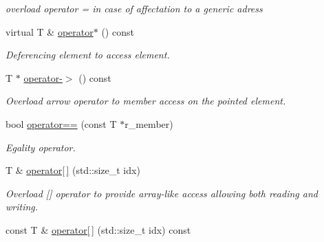 \begin{DoxyCompactItemize}
\begin{DoxyCompactList}\small\item\em overload operator = in case of affectation to a generic adress \end{DoxyCompactList}\item 
\hypertarget{classsmart__ptr_ae9512b5bbf3d31ea4d72d9f53b4f9aae}{virtual T \& \hyperlink{classsmart__ptr_ae9512b5bbf3d31ea4d72d9f53b4f9aae}{operator$\ast$} () const }\label{classsmart__ptr_ae9512b5bbf3d31ea4d72d9f53b4f9aae}

\begin{DoxyCompactList}\small\item\em Deferencing element to access element. \end{DoxyCompactList}\item 
\hypertarget{classsmart__ptr_a5335c11a725ec08cf9e178a5a87c0aa0}{T $\ast$ \hyperlink{classsmart__ptr_a5335c11a725ec08cf9e178a5a87c0aa0}{operator-\/$>$} () const }\label{classsmart__ptr_a5335c11a725ec08cf9e178a5a87c0aa0}

\begin{DoxyCompactList}\small\item\em Overload arrow operator to member access on the pointed element. \end{DoxyCompactList}\item 
\hypertarget{classsmart__ptr_a56b7836a7c412867e75e95626f83576e}{bool \hyperlink{classsmart__ptr_a56b7836a7c412867e75e95626f83576e}{operator==} (const T $\ast$r\-\_\-member)}\label{classsmart__ptr_a56b7836a7c412867e75e95626f83576e}

\begin{DoxyCompactList}\small\item\em Egality operator. \end{DoxyCompactList}\item 
\hypertarget{classsmart__ptr_a381c1f77e00684276099482b02b652a7}{T \& \hyperlink{classsmart__ptr_a381c1f77e00684276099482b02b652a7}{operator\mbox{[}$\,$\mbox{]}} (std\-::size\-\_\-t idx)}\label{classsmart__ptr_a381c1f77e00684276099482b02b652a7}

\begin{DoxyCompactList}\small\item\em Overload \mbox{[}\mbox{]} operator to provide array-\/like access allowing both reading and writing. \end{DoxyCompactList}\item 
\hypertarget{classsmart__ptr_a7aa281850218c59e7c8cf12a6f934e62}{const T \& \hyperlink{classsmart__ptr_a7aa281850218c59e7c8cf12a6f934e62}{operator\mbox{[}$\,$\mbox{]}} (std\-::size\-\_\-t idx) const }\label{classsmart__ptr_a7aa281850218c59e7c8cf12a6f934e62}


\end{DoxyCompactItemize}
